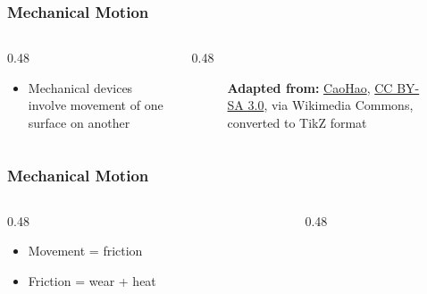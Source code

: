 \begin{frame}
	\frametitle{Mechanical Motion}

    \begin{columns}
        \begin{column}{0.48\linewidth}
            \begin{itemize}[<+- | alert@+>]
                \item Mechanical devices involve movement of one surface on another
            \end{itemize}
        \end{column}
        \begin{column}{0.48\linewidth}
            \begin{figure}
                \centering
                \resizebox{\linewidth}{!}{
                    
                }
                
                \vspace{0.5em}
                {\tiny \textbf{Adapted from:} \href{https://commons.wikimedia.org/wiki/File:Friction_surface_microstructure.png}{CaoHao}, \href{http://creativecommons.org/licenses/by-sa/3.0/}{CC BY-SA 3.0}, via Wikimedia Commons, converted to TikZ format\par}
            \end{figure}
        \end{column}
    \end{columns}
\end{frame}

\begin{frame}
	\frametitle{Mechanical Motion}

    \begin{columns}
        \begin{column}{0.48\linewidth}
            \begin{itemize}[<+- | alert@+>]
                \item Movement = friction
                \item Friction = wear + heat
            \end{itemize}
        \end{column}
        \begin{column}{0.48\linewidth}
        \end{column}
    \end{columns}
\end{frame}

